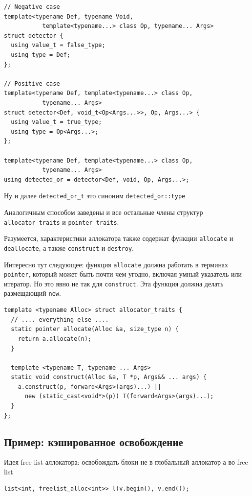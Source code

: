 \documentclass[a4paper,12pt,oneside]{book}
\begin{document}
\begin{lstlisting}
// Negative case
template<typename Def, typename Void,
	       template<typename...> class Op, typename... Args>
struct detector {
  using value_t = false_type;
  using type = Def;
};

// Positive case
template<typename Def, template<typename...> class Op,
	       typename... Args>
struct detector<Def, void_t<Op<Args...>>, Op, Args...> {
  using value_t = true_type;
  using type = Op<Args...>;
};

template<typename Def, template<typename...> class Op,
	       typename... Args>
using detected_or = detector<Def, void, Op, Args...>;
\end{lstlisting}

Ну и далее \lstinline!detected_or_t! это синоним \lstinline!detected_or::type!
\fi

Аналогичным способом заведены и все остальные члены структур \lstinline!allocator_traits! и \lstinline!pointer_traits!.

Разумеется, характеристики аллокатора также содержат функции \lstinline!allocate! и \lstinline!deallocate!, а также \lstinline!construct! и \lstinline!destroy!. 

Интересно тут следующее: функция \lstinline!allocate! должна работать в терминах \lstinline!pointer!, который может быть почти чем угодно, включая умный указатель или итератор. Но это явно не так для \lstinline!construct!. Эта функция должна делать размещающий \lstinline!new!.

\begin{lstlisting}
template <typename Alloc> struct allocator_traits {
  // .... everything else ....
  static pointer allocate(Alloc &a, size_type n) {
    return a.allocate(n);
  }

  template <typename T, typename ... Args>
  static void construct(Alloc &a, T *p, Args&& ... args) {
    a.construct(p, forward<Args>(args)...) ||
      new (static_cast<void*>(p)) T(forward<Args>(args)...);
  }
};
\end{lstlisting}

\subsection{Пример: кэшированное освобождение}\label{sub:freelist}

Идея free list аллокатора: освобождать блоки не в глобальный аллокатор а во free list

\begin{lstlisting}
list<int, freelist_alloc<int>> l(v.begin(), v.end());
\end{lstlisting}
\end{document}
